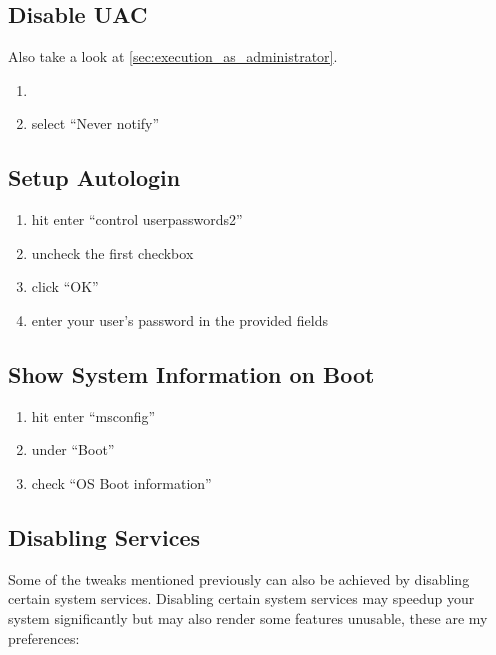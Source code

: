 \documentclass{itsarticle}
\begin{document}
\subsection{Disable UAC}
\label{sub:disable_uac}

Also take a look at \cref{sec:execution_as_administrator}.

\begin{enumerate}
    \item {}
    \item select ``Never notify''
\end{enumerate}

\subsection{Setup Autologin}
\label{sub:setup_autologin}

\begin{enumerate}
    \item hit  enter ``control userpasswords2''
    \item uncheck the first checkbox
    \item click ``OK''
    \item enter your user's password in the provided fields
\end{enumerate}

\subsection{Show System Information on Boot}
\label{sub:show_system_information_on_boot}

\begin{enumerate}
    \item hit  enter ``msconfig''
    \item under ``Boot''
    \item check ``OS Boot information''
\end{enumerate}

\subsection{Disabling Services}
\label{sub:services}

Some of the tweaks mentioned previously can also be achieved by disabling
certain system services. Disabling certain system services may speedup your
system significantly but may also render some features unusable, these are my
preferences:
\end{document}
